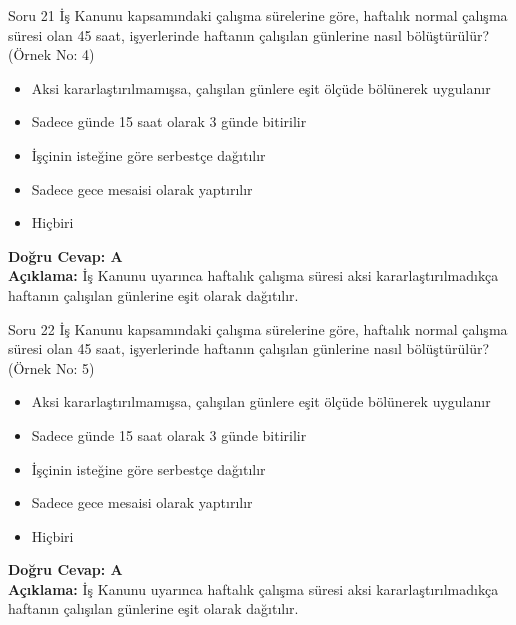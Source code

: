 \documentclass[12pt,a4paper]{article}
\begin{document}
\begin{testcard}{Soru 21}
    İş Kanunu kapsamındaki çalışma sürelerine göre, haftalık normal çalışma süresi olan 45 saat, işyerlerinde haftanın çalışılan günlerine nasıl bölüştürülür? (Örnek No: 4)
    \begin{itemize}
        \item[A)] Aksi kararlaştırılmamışsa, çalışılan günlere eşit ölçüde bölünerek uygulanır
        \item[B)] Sadece günde 15 saat olarak 3 günde bitirilir
        \item[C)] İşçinin isteğine göre serbestçe dağıtılır
        \item[D)] Sadece gece mesaisi olarak yaptırılır
        \item[E)] Hiçbiri
    \end{itemize}
    \tcblower
    \textbf{Doğru Cevap: A} \\
    \textbf{Açıklama:} İş Kanunu uyarınca haftalık çalışma süresi aksi kararlaştırılmadıkça haftanın çalışılan günlerine eşit olarak dağıtılır.
\end{testcard}

\begin{testcard}{Soru 22}
    İş Kanunu kapsamındaki çalışma sürelerine göre, haftalık normal çalışma süresi olan 45 saat, işyerlerinde haftanın çalışılan günlerine nasıl bölüştürülür? (Örnek No: 5)
    \begin{itemize}
        \item[A)] Aksi kararlaştırılmamışsa, çalışılan günlere eşit ölçüde bölünerek uygulanır
        \item[B)] Sadece günde 15 saat olarak 3 günde bitirilir
        \item[C)] İşçinin isteğine göre serbestçe dağıtılır
        \item[D)] Sadece gece mesaisi olarak yaptırılır
        \item[E)] Hiçbiri
    \end{itemize}
    \tcblower
    \textbf{Doğru Cevap: A} \\
    \textbf{Açıklama:} İş Kanunu uyarınca haftalık çalışma süresi aksi kararlaştırılmadıkça haftanın çalışılan günlerine eşit olarak dağıtılır.
\end{testcard}
\end{document}
